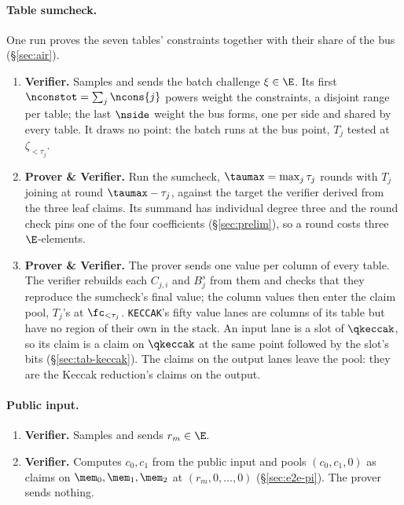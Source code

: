 \paragraph{Table sumcheck.} One run proves the seven tables' constraints together with their share of the bus (\S\ref{sec:air}).
\begin{enumerate}
\item \textbf{Verifier.} Samples and sends the batch challenge $\xi\in\E$. Its first $\nconstot=\sum_j\ncons{j}$ powers weight the constraints, a disjoint range per table; the last $\nside$ weight the bus forms, one per side and shared by every table. It draws no point: the batch runs at the bus point, $T_j$ tested at $\zeta_{<\tau_j}$.
\item \textbf{Prover \& Verifier.} Run the sumcheck, $\taumax=\max_j\tau_j$ rounds with $T_j$ joining at round $\taumax-\tau_j$, against the target the verifier derived from the three leaf claims. Its summand has individual degree three and the round check pins one of the four coefficients (\S\ref{sec:prelim}), so a round costs three $\E$-elements.
\item \textbf{Prover \& Verifier.} The prover sends one value per column of every table. The verifier rebuilds each $C_{j,i}$ and $B^{s}_j$ from them and checks that they reproduce the sumcheck's final value; the column values then enter the claim pool, $T_j$'s at $\fc_{<\tau_j}$. \texttt{KECCAK}'s fifty value lanes are columns of its table but have no region of their own in the stack. An input lane is a slot of $\qkeccak$, so its claim is a claim on $\qkeccak$ at the same point followed by the slot's bits (\S\ref{sec:tab-keccak}). The claims on the output lanes leave the pool: they are the Keccak reduction's claims on the output.
\end{enumerate}

\paragraph{Public input.}

\begin{enumerate}
\item \textbf{Verifier.} Samples and sends $r_m\in\E$.
\item \textbf{Verifier.} Computes $c_0,c_1$ from the public input and pools $(c_0,c_1,0)$ as claims on $\mem_0,\mem_1,\mem_2$ at $(r_m,0,\dots,0)$ (\S\ref{sec:e2e-pi}). The prover sends nothing.
\end{enumerate}

